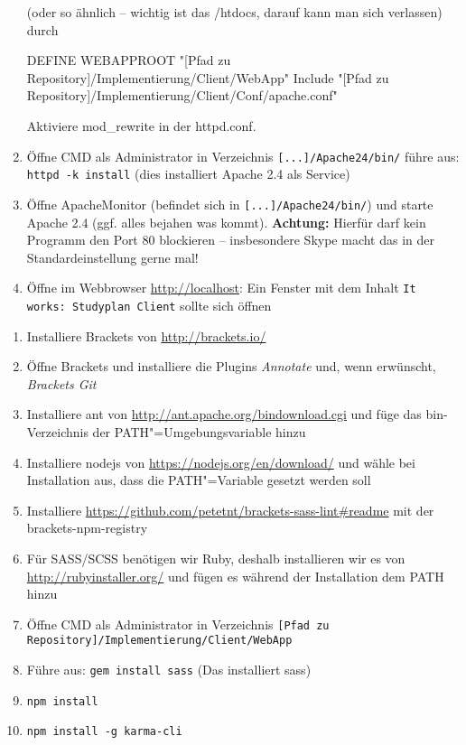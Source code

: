\begin{enumerate}
(oder so ähnlich -- wichtig ist das /htdocs, darauf kann man sich verlassen) durch
\begin{json}
DEFINE WEBAPPROOT "[Pfad zu Repository]/Implementierung/Client/WebApp"
Include "[Pfad zu Repository]/Implementierung/Client/Conf/apache.conf"
\end{json}
Aktiviere mod\_rewrite in der httpd.conf.
\item Öffne CMD als Administrator in Verzeichnis \texttt{[...]/Apache24/bin/} führe aus: \texttt{httpd -k install} (dies installiert Apache 2.4 als Service) 
\item Öffne ApacheMonitor (befindet sich in \texttt{[...]/Apache24/bin/}) und starte Apache 2.4 (ggf. alles bejahen was kommt). \newline\textbf{Achtung:} Hierfür darf kein Programm den Port 80 blockieren -- insbesondere Skype macht das in der Standardeinstellung gerne mal! 
\item Öffne im Webbrowser \url{http://localhost}: Ein Fenster mit dem Inhalt \texttt{It works: Studyplan Client} sollte sich öffnen
\end{enumerate}
\begin{enumerate}
\item Installiere Brackets von \url{http://brackets.io/}
\item Öffne Brackets und installiere die Plugins \textit{Annotate} und, wenn erwünscht, \textit{Brackets Git}
\item Installiere ant von \url{http://ant.apache.org/bindownload.cgi} und füge das bin-Verzeichnis der PATH"=Umgebungsvariable hinzu
\item Installiere nodejs von \url{https://nodejs.org/en/download/} und wähle bei Installation aus, dass die PATH"=Variable gesetzt werden soll
\item Installiere \url{https://github.com/petetnt/brackets-sass-lint\#readme} mit der brackets-npm-registry
\item Für SASS/SCSS benötigen wir Ruby, deshalb installieren wir es von \url{http://rubyinstaller.org/} und fügen es während der Installation dem PATH hinzu
\item Öffne CMD als Administrator in Verzeichnis \newline\texttt{[Pfad zu Repository]/Implementierung/Client/WebApp}
\item Führe aus: \texttt{gem install sass} (Das installiert sass)
\item \texttt{npm install}
\item \texttt{npm install -g karma-cli}
\end{enumerate}


